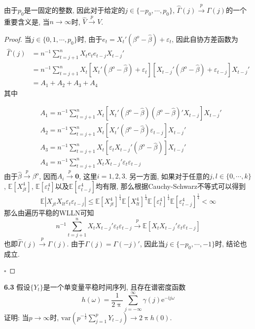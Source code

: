 \documentclass[cn,12pt,math=mtpro2,citestyle=gb7714-2015,bibstyle=gb7714-2015,twocol,mode=simple]{elegantbook}
\newcommand{\E}{\mathbb{E}}
\begin{document}
由于$p_0$是一固定的整数, 因此对于给定的$j\in\{-p_0,\cdots,p_0\}$, $\hat{\Gamma}(j)\xrightarrow{p}\Gamma(j)$的一个重要含义是, 当$n\to\infty$时, $\hat{V}\xrightarrow{p}V$.
\begin{proof}
 当$j\in\{0,1,\cdots,p_0\}$时,  由于$e_t=X_t'(\beta^o-\hat{\beta})+\varepsilon_t$,  因此自协方差函数为
\begin{align*}
\hat{\Gamma}(j)&=n^{-1}\sum_{t=j+1}^{n}X_te_te_{t-j}X_{t-j}'\\
&=n^{-1}\sum_{t=j+1}^{n}X_t\left[X_t'(\beta^o-\hat{\beta})+\varepsilon_t\right]\left[X_{t-j}'(\beta^o-\hat{\beta})+\varepsilon_{t-j}\right]X_{t-j}' \\
&=A_1+A_2+A_3+A_4
\end{align*}
其中

\begin{align*}
&A_1=n^{-1}\sum_{t=j+1}^{n}X_t\left[X_t'(\beta^o-\hat{\beta})(\beta^o-\hat{\beta})'X_{t-j}\right]X_{t-j}' \\
&A_2=n^{-1}\sum_{t=j+1}^{n}X_t\left[X_t'(\beta^o-\hat{\beta})\varepsilon_{t-j}\right]X_{t-j}' \\
&A_3=n^{-1}\sum_{t=j+1}^{n}X_t\left[\varepsilon_tX_{t-j}'(\beta^o-\hat{\beta})\right]X_{t-j}' \\
&A_4=n^{-1}\sum_{t=j+1}^{n}X_tX_{t-j}'\varepsilon_t\varepsilon_{t-j}
\end{align*}
由于$\hat{\beta}\xrightarrow{p} \beta^o$, 因而$A_i\xrightarrow{p} \mathbf{0}$, 这里$i=1, 2, 3$. 另一方面, 如果对于任意的$j, l\in\{0,\cdots,k\}$, $\E[X_ {jt}^4]$, $\E[\varepsilon_t^4]$以及$\E[\varepsilon_{t-j}^4]$均有限, 那么根据Cauchy-Schwarz不等式可以得到
$$\E|X_{jt}X_{lt}\varepsilon_{t}\varepsilon_{t-j}|\leq\E[X_{jt}^4]^{\frac{1}{4}}\E[X_{lt}^4]^{\frac{1}{4}}\E[\varepsilon_{t}^4]^{\frac{1}{4}}\E[\varepsilon_{t-j}^4]^{\frac{1}{4}}<\infty$$
那么由遍历平稳的WLLN可知
$$n^{-1}\sum_{t=j+1}^{n}X_tX_{t-j}'\varepsilon_t\varepsilon_{t-j}\xrightarrow{p}\E[X_tX_{t-j}'\varepsilon_t\varepsilon_{t-j}]$$
也即$\hat{\Gamma}(j)\xrightarrow{p}\Gamma(j)$. 由于$\Gamma(j)=\Gamma(-j)'$, 因此当$j\in\{-p_0,\cdots,-1\}$时, 结论也成立.

$\square$
\end{proof}

\textbf{6.3} 假设$\{Y_t\}$是一个单变量平稳时间序列, 且存在谱密度函数
$$h(\omega)=\frac{1}{2\uppi}\sum_{j=-\infty}^{\infty}\gamma(j)\text{e}^{-\text{i}j\omega}$$
证明: 当$p\to\infty$时, $\displaystyle\text{var}\left(p^{-\frac{1}{2}}\sum_{j=1}^{p}Y_{t-j}\right)\to2\uppi h(0)$.
\end{document}
